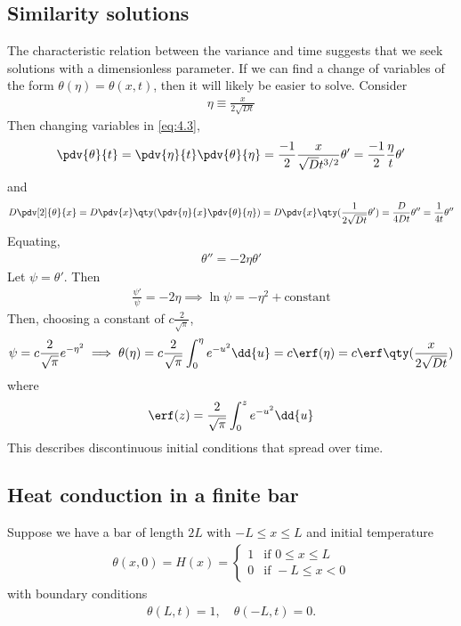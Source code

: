 \subsection{Similarity solutions}
The characteristic relation between the variance and time suggests that we seek solutions with a dimensionless parameter.
If we can find a change of variables of the form $\theta(\eta) = \theta(x,t)$, then it will likely be easier to solve.
Consider
\begin{align} \label{eq:4.5}
	\eta \equiv \frac{x}{2\sqrt{Dt}}
\end{align}
Then changing variables in \cref{eq:4.3},
\begin{align*}
	\pdv{\theta}{t} = \pdv{\eta}{t} \pdv{\theta}{\eta} = \frac{-1}{2} \frac{x}{\sqrt{D} t^{3/2}} \theta' = \frac{-1}{2} \frac{\eta}{t} \theta'
\end{align*}
and
\begin{align*}
	D \pdv[2]{\theta}{x} = D \pdv{x} \qty(\pdv{\eta}{x} \pdv{\theta}{\eta}) = D \pdv{x} \qty(\frac{1}{2\sqrt{Dt}} \theta') = \frac{D}{4Dt} \theta'' = \frac{1}{4t} \theta''
\end{align*}
Equating,
\begin{align} \label{eq:4.6}
	\theta'' = -2 \eta \theta'
\end{align}
Let $\psi = \theta'$.
Then
\begin{align*}
	\frac{\psi'}{\psi} = -2\eta \implies \ln \psi = -\eta^2 + \text{constant}
\end{align*}
Then, choosing a constant of $c\frac{2}{\sqrt{\pi}}$,
\begin{align} \label{eq:4.7}
	\psi = c\frac{2}{\sqrt{\pi}} e^{-\eta^2} \implies \theta(\eta) = c\frac{2}{\sqrt{\pi}} \int_0^\eta e^{-u^2} \dd{u} = c \erf(\eta) = c \erf \qty(\frac{x}{2\sqrt{Dt}})
\end{align}
where
\begin{align*}
	\erf(z) = \frac{2}{\sqrt{\pi}} \int_0^z e^{-u^2} \dd{u}
\end{align*}
This describes discontinuous initial conditions that spread over time.

\begingroup
{}

\endgroup

\subsection{Heat conduction in a finite bar}
Suppose we have a bar of length $2L$ with $-L \leq x \leq L$ and initial temperature
\begin{align} \label{eq:4.8}
	\theta(x,0) = H(x) = \begin{cases}
		1 & \text{if } 0 \leq x \leq L \\
		0 & \text{if } -L \leq x < 0
	\end{cases}
\end{align}
with boundary conditions 
\begin{align} \label{eq:4.9}
    \theta(L, t) = 1, \quad \theta(-L, t) = 0.
\end{align}

